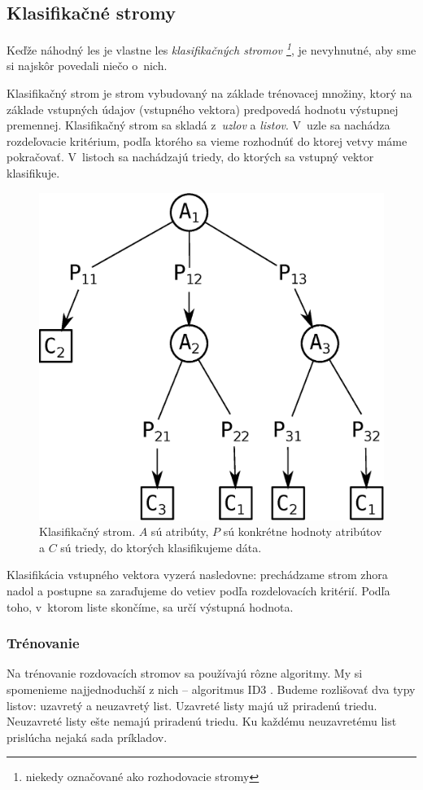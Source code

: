 \subsection{Klasifikačné stromy}
Keďže náhodný les je vlastne les \textit{klasifikačných stromov \footnote{niekedy označované ako rozhodovacie stromy}}, je nevyhnutné, aby sme si najskôr povedali niečo o~nich.

Klasifikačný strom je strom vybudovaný na základe trénovacej množiny, ktorý na základe vstupných údajov (vstupného vektora) predpovedá hodnotu výstupnej premennej. Klasifikačný strom sa skladá z~\textit{uzlov} a \textit{listov}. V~uzle sa nachádza rozdeľovacie kritérium, podľa ktorého sa vieme rozhodnúť do ktorej vetvy máme pokračovať. V~listoch sa nachádzajú triedy, do ktorých sa vstupný vektor klasifikuje.


\begin{figure}[htp]
    \centering
    \includegraphics[width=.5\textwidth]{images/decision_tree}
    \caption[Klasifikačný strom]{Klasifikačný strom. $A$ sú atribúty, $P$ sú konkrétne hodnoty atribútov a $C$ sú triedy, do ktorých klasifikujeme dáta.}
\end{figure}

Klasifikácia vstupného vektora vyzerá nasledovne: prechádzame strom zhora nadol a postupne sa zaraďujeme do vetiev podľa rozdelovacích kritérií. Podľa toho, v~ktorom liste skončíme, sa určí výstupná hodnota.

\subsubsection{Trénovanie}

Na trénovanie rozdovacích stromov sa používajú rôzne algoritmy. My si spomenieme najjednoduchší z nich -- algoritmus ID3 \cite{wiki:id3}. Budeme rozlišovať dva typy listov: uzavretý a neuzavretý list. Uzavreté listy majú už priradenú triedu. Neuzavreté listy ešte nemajú priradenú triedu. Ku každému neuzavretému list prislúcha nejaká sada príkladov.

